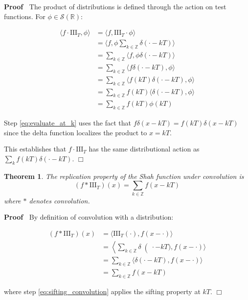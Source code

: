\documentclass{article}
\newcommand{\cdummy}{\cdot}
\newenvironment{proof}{\noindent\textbf{Proof\ }}{\hspace*{\fill}$\Box$\medskip}
\newtheorem{theorem}{Theorem}
\begin{document}
\begin{proof}
  The product of distributions is defined through the action on test
  functions. For $\phi \in \mathcal{S} (\mathbb{R})$:
  
  \begin{align}
    \langle f \cdot \text{III}_T, \phi \rangle & = \langle f, \text{III}_T
    \cdot \phi \rangle  \label{eq:product_definition}\\
    & = \langle f, \phi \sum_{k \in \mathbb{Z}} \delta (\cdot - kT) \rangle 
    \label{eq:shah_expand}\\
    & = \sum_{k \in \mathbb{Z}} \langle f, \phi \delta (\cdot - kT) \rangle 
    \label{eq:distribute_sum}\\
    & = \sum_{k \in \mathbb{Z}} \langle f \delta (\cdot - kT), \phi \rangle 
    \label{eq:product_delta}\\
    & = \sum_{k \in \mathbb{Z}} \langle f (kT) \delta (\cdot - kT), \phi
    \rangle  \label{eq:evaluate_at_k}\\
    & = \sum_{k \in \mathbb{Z}} f (kT) \langle \delta (\cdot - kT), \phi
    \rangle  \label{eq:factor_constant}\\
    & = \sum_{k \in \mathbb{Z}} f (kT) \phi (kT)  \label{eq:delta_action}
  \end{align}
  
  Step \eqref{eq:evaluate_at_k} uses the fact that $f \delta (x - kT) = f (kT)
  \delta (x - kT)$ since the delta function localizes the product to $x = kT$.
  
  This establishes that $f \cdot \text{III}_T$ has the same distributional
  action as $\sum_k f (kT) \delta (\cdummy - kT)$.
\end{proof}

\begin{theorem}
  \label{thm:replication_property}The replication property of the Shah
  function under convolution is
  \begin{equation}
    \label{eq:replication} (f \ast \text{III}_T) (x) = \sum_{k \in \mathbb{Z}}
    f (x - kT)
  \end{equation}
  where $\ast$ denotes convolution.
\end{theorem}

\begin{proof}
  By definition of convolution with a distribution:
  
  \begin{align}
    (f \ast \text{III}_T) (x) & = \langle \text{III}_T (\cdot), f (x - \cdot)
    \rangle  \label{eq:convolution_def}\\
    & = \left\langle \sum_{k \in \mathbb{Z}} \delta \right( \cdot - kT), f (x
    - \cdot) \rangle  \label{eq:shah_in_convolution}\\
    & = \sum_{k \in \mathbb{Z}} \langle \delta (\cdot - kT), f (x - \cdot)
    \rangle  \label{eq:sum_linearity}\\
    & = \sum_{k \in \mathbb{Z}} f (x - kT)  \label{eq:sifting_convolution}
  \end{align}
  
  where step \eqref{eq:sifting_convolution} applies the sifting property at
  $kT$.
\end{proof}
\end{document}
